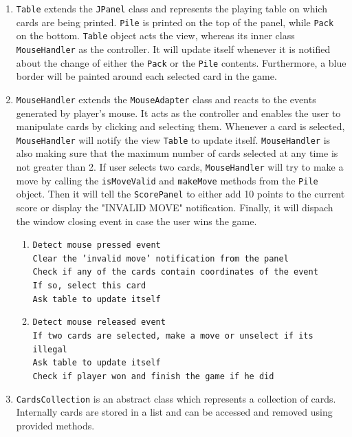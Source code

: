 \documentclass[a4paper, 12pt, titlepage]{article}
\begin{document}
\begin{enumerate}
	\item \texttt{Table} extends the \texttt{JPanel} class and represents the playing 
		table on which cards are being printed. \texttt{Pile} is printed on the top of 
		the panel, while \texttt{Pack} on the bottom. \texttt{Table} object acts the 
		view, whereas its inner class \texttt{MouseHandler} as the controller. 
		It will update itself whenever it is notified about the change of
		either the \texttt{Pack} or the \texttt{Pile} contents. Furthermore, a blue border
		will be painted around each selected card in the game.
		
	\item \texttt{MouseHandler} extends the \texttt{MouseAdapter} class and reacts to
		the events generated by player's mouse. It acts as the controller and enables the 
		user to manipulate cards by clicking and selecting them. Whenever a card is 
		selected, \texttt{MouseHandler} will notify the view \texttt{Table} to update 
		itself. \texttt{MouseHandler} is also making sure that the maximum number of 
		cards selected at any time is not greater than 2. If user selects two cards, 
		\texttt{MouseHandler} will try to make a move by calling the \texttt{isMoveValid}
		 and \texttt{makeMove} methods from the \texttt{Pile} object. Then it will 
		 tell the \texttt{ScorePanel} to either add 10 points to the current score or
		 display the "INVALID MOVE" notification. Finally, it will dispach the window 
		 closing event in case the user wins the game.
		 \begin{enumerate}
			 \item \texttt{Detect mouse pressed event\\
				Clear the 'invalid move' notification from the panel\\
				Check if any of the cards contain coordinates of the event\\
				If so, select this card\\
				Ask table to update itself
				}
			\item \texttt{Detect mouse released event\\
				If two cards are selected, make a move or unselect if its illegal\\
				Ask table to update itself\\
				Check if player won and finish the game if he did
				}
		\end{enumerate} 
	\item \texttt{CardsCollection} is an abstract class which represents a collection of 
		cards. Internally cards are stored in a list and can be accessed and removed 
		using provided methods.
		

\end{enumerate}
\end{document}
